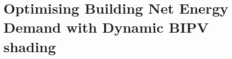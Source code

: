 
\chapter{Optimising Building Net Energy Demand with Dynamic BIPV shading}
\label{ch:asfSimulation}









